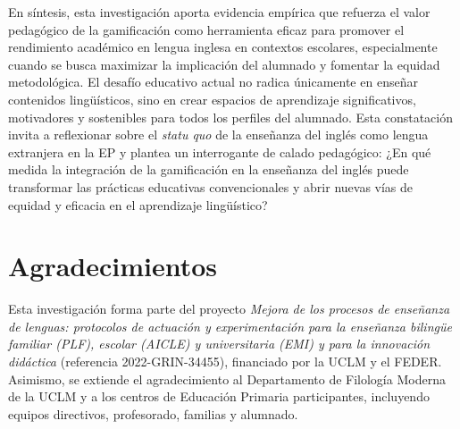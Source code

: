 \documentclass[spanish]{textolivre}
\begin{document}
En síntesis, esta investigación aporta evidencia empírica que refuerza el valor pedagógico de la gamificación como herramienta eficaz para promover el rendimiento académico en lengua inglesa en contextos escolares, especialmente cuando se busca maximizar la implicación del alumnado y fomentar la equidad metodológica. El desafío educativo actual no radica únicamente en enseñar contenidos lingüísticos, sino en crear espacios de aprendizaje significativos, motivadores y sostenibles para todos los perfiles del alumnado. Esta constatación invita a reflexionar sobre el \textit{statu quo} de la enseñanza del inglés como lengua extranjera en la EP y plantea un interrogante de calado pedagógico: ¿En qué medida la integración de la gamificación en la enseñanza del inglés puede transformar las prácticas educativas convencionales y abrir nuevas vías de equidad y eficacia en el aprendizaje lingüístico?

\section*{Agradecimientos}
Esta investigación forma parte del proyecto \textit{Mejora de los procesos de enseñanza de lenguas: protocolos de actuación y experimentación para la enseñanza bilingüe familiar (PLF), escolar (AICLE) y universitaria (EMI) y para la innovación didáctica} (referencia 2022-GRIN-34455), financiado por la UCLM y el FEDER. Asimismo, se extiende el agradecimiento al Departamento de Filología Moderna de la UCLM y a los centros de Educación Primaria participantes, incluyendo equipos directivos, profesorado, familias y alumnado.


\printbibliography\label{sec-bib}



\begin{dataavailability}
\end{dataavailability}
\end{document}
